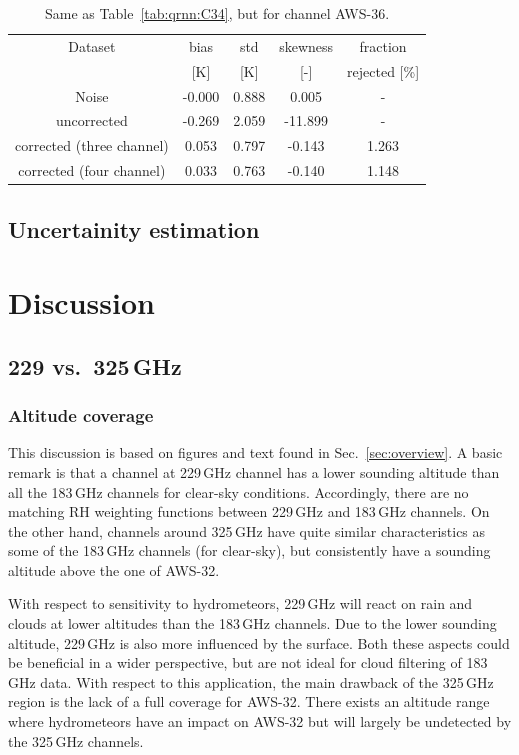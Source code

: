 \documentclass[12pt]{article}
\begin{document}
\begin{table}[!tb]
	\centering
	\begin{tabular}[b]{c|c|c|c|c}
	Dataset  		  &   bias &   std &   skewness & fraction  \\
	&   [K]  &   [K] & [-] & rejected [\%]\\
		\hline
Noise                     & -0.000 & 0.888 &              0.005 &      - \\
uncorrected               & -0.269 & 2.059 &            -11.899 &      - \\
corrected (three channel) &  0.053 & 0.797 &             -0.143 &      1.263 \\
corrected (four channel)  &  0.033 & 0.763 &             -0.140 &      1.148 \\
		\hline
	\end{tabular}
	\caption{ Same as Table~\ref{tab:qrnn:C34}, but for channel AWS-36.}
	\label{tab:qrnn:C36}
\end{table}

\subsection{Uncertainity estimation}
\section{Discussion}

\subsection{229 vs.\ 325\,GHz}


\subsubsection{Altitude coverage}
%
This discussion is based on figures and text found in Sec.~\ref{sec:overview}.
A basic remark is that a channel at 229\,GHz channel has a lower sounding
altitude than all the 183\,GHz channels for clear-sky conditions. Accordingly,
there are no matching RH weighting functions between 229\,GHz and 183\,GHz
channels. On the other hand, channels around 325\,GHz have quite similar
characteristics as some of the 183\,GHz channels (for clear-sky), but
consistently have a sounding altitude above the one of AWS-32.

With respect to sensitivity to hydrometeors, 229\,GHz will react on rain and
clouds at lower altitudes than the 183\,GHz channels. Due to the lower sounding
altitude, 229\,GHz is also more influenced by the surface. Both these aspects
could be beneficial in a wider perspective, but are not ideal for cloud
filtering of 183\,GHz data. With respect to this application, the main drawback
of the 325\,GHz region is the lack of a full coverage for AWS-32. There exists
an altitude range where hydrometeors have an impact on AWS-32 but will largely
be undetected by the 325\,GHz channels.
\end{document}
